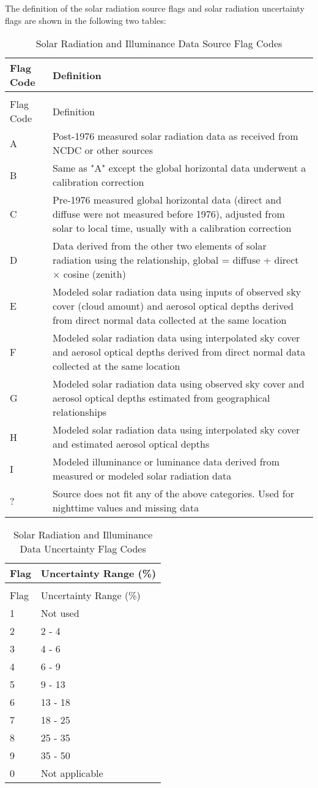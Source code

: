 The definition of the solar radiation source flags and solar radiation uncertainty flags are shown in the following two tables:

\begin{longtable}[c]{p{1.5in}p{4.5in}}
\caption{Solar Radiation and Illuminance Data Source Flag Codes \label{table:solar-radiation-and-illuminance-data-source}} \tabularnewline
\toprule 
Flag Code & Definition \tabularnewline
\midrule
\endfirsthead

\caption[]{Solar Radiation and Illuminance Data Source Flag Codes} \tabularnewline
\toprule 
Flag Code & Definition \tabularnewline
\midrule
\endhead

A & Post-1976 measured solar radiation data as received from NCDC or other sources \tabularnewline
B & Same as "A" except the global horizontal data underwent a calibration correction \tabularnewline
C & Pre-1976 measured global horizontal data (direct and diffuse were not measured before 1976), adjusted from solar to local time, usually with a calibration correction \tabularnewline
D & Data derived from the other two elements of solar radiation using the relationship, global = diffuse + direct $\times$ cosine (zenith) \tabularnewline
E & Modeled solar radiation data using inputs of observed sky cover (cloud amount) and aerosol optical depths derived from direct normal data collected at the same location \tabularnewline
F & Modeled solar radiation data using interpolated sky cover and aerosol optical depths derived from direct normal data collected at the same location \tabularnewline
G & Modeled solar radiation data using observed sky cover and aerosol optical depths estimated from geographical relationships \tabularnewline
H & Modeled solar radiation data using interpolated sky cover and estimated aerosol optical depths \tabularnewline
I & Modeled illuminance or luminance data derived from measured or modeled solar radiation data \tabularnewline
? & Source does not fit any of the above categories. Used for nighttime values and missing data \tabularnewline
\bottomrule
\end{longtable}

\begin{longtable}[c]{@{}ll@{}}
\caption{Solar Radiation and Illuminance Data Uncertainty Flag Codes \label{table:solar-radiation-and-illuminance-data}} \tabularnewline
\toprule 
Flag & Uncertainty Range (\%) \tabularnewline
\midrule
\endfirsthead

\caption[]{Solar Radiation and Illuminance Data Uncertainty Flag Codes} \tabularnewline
\toprule 
Flag & Uncertainty Range (\%) \tabularnewline
\midrule
\endhead

1 & Not used \tabularnewline
2 & 2 - 4 \tabularnewline
3 & 4 - 6 \tabularnewline
4 & 6 - 9 \tabularnewline
5 & 9 - 13 \tabularnewline
6 & 13 - 18 \tabularnewline
7 & 18 - 25 \tabularnewline
8 & 25 - 35 \tabularnewline
9 & 35 - 50 \tabularnewline
0 & Not applicable \tabularnewline
\bottomrule
\end{longtable}

